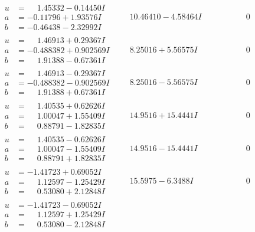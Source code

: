 \documentclass[1p]{elsarticle_modified}
\theoremstyle{definition}
\begin{document}
$$\begin{array}{c|c|c}
\begin{aligned}
u &= \phantom{-}1.45332 - 0.14450 I \\
a &= -0.11796 + 1.93576 I \\
b &= -0.46438 - 2.32992 I\end{aligned}
 & \phantom{-}10.46410 - 4.58464 I & \phantom{-0.000000 } 0 \\ \hline\begin{aligned}
u &= \phantom{-}1.46913 + 0.29367 I \\
a &= -0.488382 + 0.902569 I \\
b &= \phantom{-}1.91388 - 0.67361 I\end{aligned}
 & \phantom{-}8.25016 + 5.56575 I & \phantom{-0.000000 } 0 \\ \hline\begin{aligned}
u &= \phantom{-}1.46913 - 0.29367 I \\
a &= -0.488382 - 0.902569 I \\
b &= \phantom{-}1.91388 + 0.67361 I\end{aligned}
 & \phantom{-}8.25016 - 5.56575 I & \phantom{-0.000000 } 0 \\ \hline\begin{aligned}
u &= \phantom{-}1.40535 + 0.62626 I \\
a &= \phantom{-}1.00047 + 1.55409 I \\
b &= \phantom{-}0.88791 - 1.82835 I\end{aligned}
 & \phantom{-}14.9516 + 15.4441 I & \phantom{-0.000000 } 0 \\ \hline\begin{aligned}
u &= \phantom{-}1.40535 - 0.62626 I \\
a &= \phantom{-}1.00047 - 1.55409 I \\
b &= \phantom{-}0.88791 + 1.82835 I\end{aligned}
 & \phantom{-}14.9516 - 15.4441 I & \phantom{-0.000000 } 0 \\ \hline\begin{aligned}
u &= -1.41723 + 0.69052 I \\
a &= \phantom{-}1.12597 - 1.25429 I \\
b &= \phantom{-}0.53080 + 2.12848 I\end{aligned}
 & \phantom{-}15.5975 - 6.3488 I & \phantom{-0.000000 } 0 \\ \hline\begin{aligned}
u &= -1.41723 - 0.69052 I \\
a &= \phantom{-}1.12597 + 1.25429 I \\
b &= \phantom{-}0.53080 - 2.12848 I\end{aligned}

\end{array}$$
\end{document}
